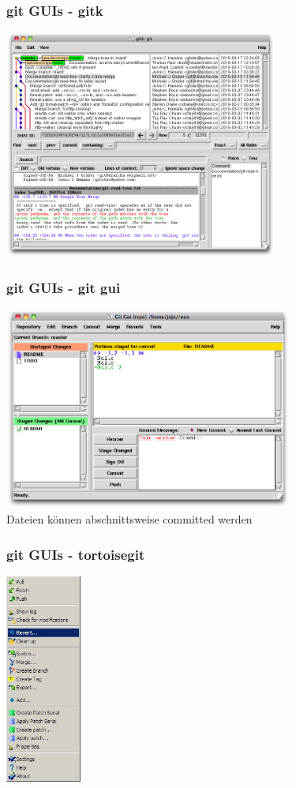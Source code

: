 \begin{frame}
  \frametitle{git GUIs - gitk}
  \vspace{-0.3cm}
  \begin{center}
    \includegraphics[width=9.0cm]{img/gitk.png}
  \end{center}
\end{frame}

\begin{frame}
  \frametitle{git GUIs - git gui}
  \vspace{-0.3cm}
  \begin{center}
    \includegraphics[width=9.5cm]{img/git_gui.png} \\
    Dateien können abschnittsweise committed werden
  \end{center}
\end{frame}

\begin{frame}
  \frametitle{git GUIs - tortoisegit}
  \vspace{-0.3cm}
  \begin{center}
    \includegraphics[width=2.5cm]{img/tortoisegit.png}
  \end{center}
\end{frame}

